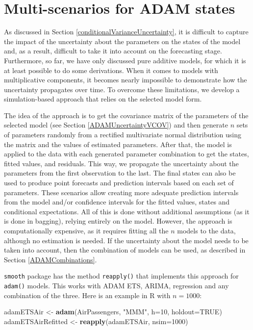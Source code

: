 \documentclass[]{book}
\newenvironment{Shaded}{\begin{snugshade}}{\end{snugshade}}
\newcommand{\DataTypeTok}[1]{\textcolor[rgb]{0.13,0.29,0.53}{#1}}
\newcommand{\DecValTok}[1]{\textcolor[rgb]{0.00,0.00,0.81}{#1}}
\newcommand{\KeywordTok}[1]{\textcolor[rgb]{0.13,0.29,0.53}{\textbf{#1}}}
\newcommand{\NormalTok}[1]{#1}
\newcommand{\OtherTok}[1]{\textcolor[rgb]{0.56,0.35,0.01}{#1}}
\newcommand{\StringTok}[1]{\textcolor[rgb]{0.31,0.60,0.02}{#1}}
\theoremstyle{definition}
\theoremstyle{definition}
\theoremstyle{definition}
\theoremstyle{definition}
\theoremstyle{remark}
\begin{document}
\hypertarget{adamRefitted}{%
\section{Multi-scenarios for ADAM states}\label{adamRefitted}}

As discussed in Section \ref{conditionalVarianceUncertainty}, it is difficult to capture the impact of the uncertainty about the parameters on the states of the model and, as a result, difficult to take it into account on the forecasting stage. Furthermore, so far, we have only discussed pure additive models, for which it is at least possible to do some derivations. When it comes to models with multiplicative components, it becomes nearly impossible to demonstrate how the uncertainty propagates over time. To overcome these limitations, we develop a simulation-based approach that relies on the selected model form.

The idea of the approach is to get the covariance matrix of the parameters of the selected model (see Section \ref{ADAMUncertaintyVCOV}) and then generate \(n\) sets of parameters randomly from a rectified multivariate normal distribution using the matrix and the values of estimated parameters. After that, the model is applied to the data with each generated parameter combination to get the states, fitted values, and residuals. This way, we propagate the uncertainty about the parameters from the first observation to the last. The final states can also be used to produce point forecasts and prediction intervals based on each set of parameters. These scenarios allow creating more adequate prediction intervals from the model and/or confidence intervals for the fitted values, states and conditional expectations. All of this is done without additional assumptions (as it is done in bagging), relying entirely on the model. However, the approach is computationally expensive, as it requires fitting all the \(n\) models to the data, although no estimation is needed. If the uncertainty about the model needs to be taken into account, then the combination of models can be used, as described in Section \ref{ADAMCombinations}.

\texttt{smooth} package has the method \texttt{reapply()} that implements this approach for \texttt{adam()} models. This works with ADAM ETS, ARIMA, regression and any combination of the three. Here is an example in R with \(n=1000\):

\begin{Shaded}
\begin{Highlighting}[]
\NormalTok{adamETSAir <-}\StringTok{ }\KeywordTok{adam}\NormalTok{(AirPassengers, }\StringTok{"MMM"}\NormalTok{, }\DataTypeTok{h=}\DecValTok{10}\NormalTok{, }\DataTypeTok{holdout=}\OtherTok{TRUE}\NormalTok{)}
\NormalTok{adamETSAirRefitted <-}\StringTok{ }\KeywordTok{reapply}\NormalTok{(adamETSAir, }\DataTypeTok{nsim=}\DecValTok{1000}\NormalTok{)}
\end{Highlighting}
\end{Shaded}
\end{document}

